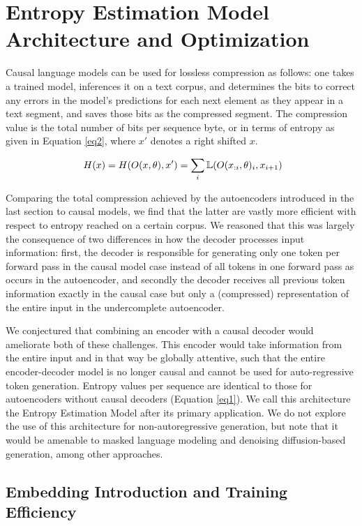 \documentclass{article}
\begin{document}
\section{Entropy Estimation Model Architecture and Optimization}

    Causal language models can be used for lossless compression as follows: one takes a trained model, inferences it on a text corpus, and determines the bits to correct any errors in the model's predictions for each next element as they appear in a text segment, and saves those bits as the compressed segment. The compression value is the total number of bits per sequence byte, or in terms of entropy as given in Equation \ref{eq2}, where $x'$ denotes a right shifted $x$.

    \begin{equation}\
    H(x) = H(O(x, \theta), x') = \sum_i \Bbb L(O(x_{:i}, \theta)_i, x_{i+1}) \\
    \label{eq2}
    \end{equation}

    Comparing the total compression achieved by the autoencoders introduced in the last section to causal models, we find that the latter are vastly more efficient with respect to entropy reached on a certain corpus. We reasoned that this was largely the consequence of two differences in how the decoder processes input information: first, the decoder is responsible for generating only one token per forward pass in the causal model case instead of all tokens in one forward pass as occurs in the autoencoder, and secondly the decoder receives all previous token information exactly in the causal case but only a (compressed) representation of the entire input in the undercomplete autoencoder.

    We conjectured that combining an encoder with a causal decoder would ameliorate both of these challenges. This encoder would take information from the entire input and in that way be globally attentive, such that the entire encoder-decoder model is no longer causal and cannot be used for auto-regressive token generation. Entropy values per sequence are identical to those for autoencoders without causal decoders (Equation \ref{eq1}). We call this architecture the Entropy Estimation Model after its primary application. We do not explore the use of this architecture for non-autoregressive generation, but note that it would be amenable to masked language modeling and denoising diffusion-based generation, among other approaches.

    \subsection{Embedding Introduction and Training Efficiency}
\end{document}
